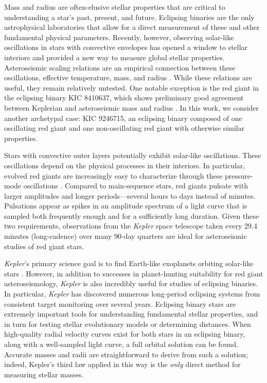 Mass and radius are often-elusive stellar properties that are critical to understanding a star's past, present, and future. Eclipsing binaries are the only astrophysical laboratories that allow for a direct measurement of these and other fundamental physical parameters. Recently, however, observing solar-like oscillations in stars with convective envelopes has opened a window to stellar interiors and provided a new way to measure global stellar properties. Asteroseismic scaling relations are an empirical connection between these oscillations, effective temperature, mass, and radius \citep{kje95,hub10,mos13}. While these relations are useful, they remain relatively untested. One notable exception is the red giant in the eclipsing binary KIC 8410637, which shows preliminary good agreement between Keplerian and asteroseismic mass and radius \citep{fra13}. In this work, we consider another archetypal case: KIC 9246715, an eclipsing binary composed of one oscillating red giant and one non-oscillating red giant with otherwise similar properties.

Stars with convective outer layers potentially exhibit solar-like oscillations. These oscillations depend on the physical processes in their interiors. In particular, evolved red giants are increasingly easy to characterize through these pressure-mode oscillations \citep[for a review of this topic, see][]{cha13}. Compared to main-sequence stars, red giants pulsate with larger amplitudes and longer periods---several hours to days instead of minutes. Pulsations appear as spikes in an amplitude spectrum of a light curve that is sampled both frequently enough and for a sufficiently long duration. Given these two requirements, observations from the \emph{Kepler} space telescope taken every 29.4 minutes (long-cadence) over many 90-day quarters are ideal for asteroseismic studies of red giant stars.

\emph{Kepler}'s primary science goal is to find Earth-like exoplanets orbiting solar-like stars \citep{bor10}. However, in addition to successes in planet-hunting suitability for red giant asteroseismology, \emph{Kepler} is also incredibly useful for studies of eclipsing binaries. In particular, \emph{Kepler} has discovered numerous long-period eclipsing systems from consistent target monitoring over several years. Eclipsing binary stars are extremely important tools for understanding fundamental stellar properties, and in turn for testing stellar evolutionary models or determining distances. When high-quality radial velocity curves exist for both stars in an eclipsing binary, along with a well-sampled light curve, a full orbital solution can be found. Accurate masses and radii are straightforward to derive from such a solution; indeed, Kepler's third law applied in this way is the \emph{only} direct method for measuring stellar masses.

